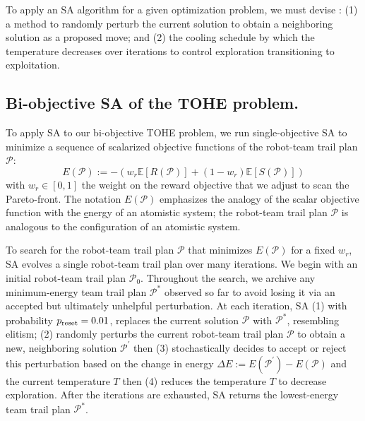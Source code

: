 \documentclass[fleqn,10pt,lineno]{wlpeerj}
\begin{document}
  
  To apply an SA algorithm for a given optimization problem, we must devise \cite{simon2013evolutionary}: 
  (1) a method to randomly perturb the current solution to obtain a neighboring solution as a proposed move; and 
  (2) the cooling schedule by which the temperature decreases over iterations to control exploration transitioning to exploitation.
    
\subsection{Bi-objective SA of the TOHE problem.}
To apply SA to our bi-objective TOHE problem, we run single-objective SA to minimize a sequence of scalarized objective functions of the robot-team trail plan $\mathcal{P}$:
\begin{equation}
	E(\mathcal{P}):= -\left( w_r \mathbb{E}[R(\mathcal{P})] + (1-w_r )\mathbb{E}[S(\mathcal{P})]  \right) \label{eq:energy}
\end{equation} with $w_r \in [0, 1]$ the weight on the reward objective that we adjust to scan the Pareto-front. 
The notation $E(\mathcal{P})$ emphasizes the analogy of the scalar objective function with the \underline{e}nergy of an atomistic system; the robot-team trail plan $\mathcal{P}$ is analogous to the configuration of an atomistic system.

To search for the robot-team trail plan $\mathcal{P}$ that minimizes $E(\mathcal{P})$ for a fixed $w_r$, SA evolves a single robot-team trail plan over many iterations. We begin with an initial robot-team trail plan $\mathcal{P}_0$. Throughout the search, we archive any minimum-energy team trail plan $\mathcal{P}^*$ observed so far to avoid losing it via an accepted but ultimately unhelpful perturbation.
At each iteration, SA 
   (1) with probability $p_{\rm reset}=0.01$, replaces the current solution $\mathcal{P}$ with $\mathcal{P}^*$, resembling elitism;
   (2) randomly perturbs the current robot-team trail plan $\mathcal{P}$ to obtain a new, neighboring solution $\mathcal{P}^\prime$ then 
   (3) stochastically decides to accept or reject this perturbation based on the change in energy $\Delta E:= E(\mathcal{P^\prime})- E(\mathcal{P})$ and the current temperature $T$ then   
   (4) reduces the temperature $T$ to decrease exploration. 
After the iterations are exhausted, SA returns the lowest-energy team trail plan $\mathcal{P}^*$.
\end{document}
